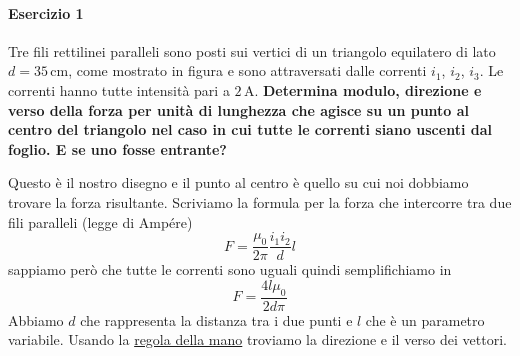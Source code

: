 \paragraph{Esercizio 1}
Tre fili rettilinei paralleli sono posti sui vertici di un triangolo equilatero di lato 
$d=35\,\text{cm}$, come mostrato in figura e sono attraversati dalle correnti $i_1$, $i_2$, $i_3$. Le
correnti hanno tutte intensità pari a $2\,\text{A}$. \textbf{Determina modulo, direzione e verso
  della forza per unità di lunghezza che agisce su un punto al centro del triangolo nel caso in cui
tutte le correnti siano uscenti dal foglio. E se uno fosse entrante?}
\divisor

\begin{center}
\end{center}
Questo è il nostro disegno e il punto al centro è quello su cui noi dobbiamo trovare la forza 
risultante. Scriviamo la formula per la forza che intercorre tra due fili paralleli (legge di Ampére)
\begin{equation*}
  F = \frac{\mu_0}{2\pi}\frac{i_1i_2}{d}l
\end{equation*}
sappiamo però che tutte le correnti sono uguali quindi semplifichiamo in
\begin{equation*}
  F = \frac{4l\mu_0}{2d\pi}
\end{equation*}
Abbiamo $d$ che rappresenta la distanza tra i due punti e $l$ che è un parametro variabile. Usando la
\hyperref[subsec:vettori:prodottoVettoriale]{regola della mano} troviamo la direzione e il verso dei
vettori.
\begin{center}
\end{center}
